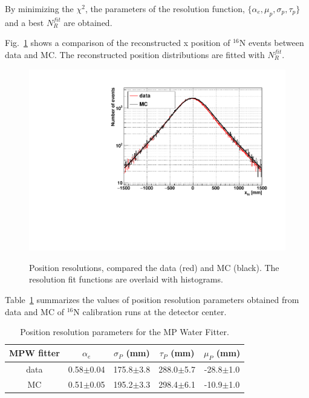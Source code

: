 By minimizing the $\chi^2$, the parameters of the resolution function, $\{\alpha_e,\mu_p,\sigma_p,\tau_p\}$ and a best $N_R^{fit}$ are obtained.

Fig.~\ref{posresol} shows a comparison of the reconstructed x position of {$^{16}$}N events between data and MC. The reconstructed position distributions are fitted with $N_R^{fit}$.


\begin{figure}
	\centering
	\includegraphics[width=140mm]{posResol.pdf}\label{posresol}
	\caption{Position resolutions, compared the data (red) and MC (black). The resolution fit functions are overlaid with histograms.}
\end{figure}

Table~\ref{table_posresol} summarizes the values of position resolution parameters obtained from data and MC of {$^{16}$}N calibration runs at the detector center.
\vspace{1mm}
\begin{table}[ht]
	\centering
	\caption{Position resolution parameters for the MP Water Fitter.}
	\label{table_posresol}
	\begin{tabular}{ccccc}
		\toprule
		MPW fitter & $\alpha_e$ & $\sigma_P$ (mm) &  $\tau_P$ (mm)& $\mu_P$ (mm)\\
		\hline 
		data& 0.58$\pm$0.04 & 175.8$\pm$3.8 & 288.0$\pm$5.7 & -28.8$\pm$1.0\\	
		\hline 
		MC & 0.51$\pm$0.05 & 195.2$\pm$3.3 & 298.4$\pm$6.1 & -10.9$\pm$1.0\\
		\bottomrule
	\end{tabular}
\end{table}
\vspace{1mm}




